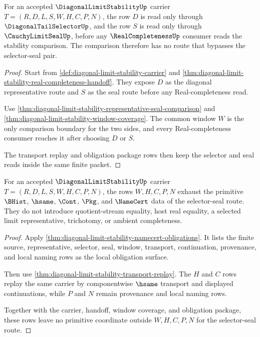 \begin{theorem}
\label{thm:diagonal-limit-stability-selector-seal-scope}
For an accepted $\DiagonalLimitStabilityUp$ carrier $T=(R,D,L,S,W,H,C,P,N)$, the row $D$ is read only through $\DiagonalTailSelectorUp$, and the row $S$ is read only through $\CauchyLimitSealUp$, before any $\RealCompletenessUp$ consumer reads the stability comparison. The comparison therefore has no route that bypasses the selector-seal pair.
\end{theorem}
\begin{proof}
Start from \autoref{def:diagonal-limit-stability-carrier} and \autoref{thm:diagonal-limit-stability-real-completeness-handoff}. They expose $D$ as the diagonal representative route and $S$ as the seal route before any Real-completeness read.

Use \autoref{thm:diagonal-limit-stability-representative-seal-comparison} and \autoref{thm:diagonal-limit-stability-window-coverage}. The common window $W$ is the only comparison boundary for the two sides, and every Real-completeness consumer reaches it after choosing $D$ or $S$.

The transport replay and obligation package rows then keep the selector and seal reads inside the same finite packet.
\end{proof}

\begin{theorem}
\label{thm:diagonal-limit-stability-primitive-route-exhaustion}
For an accepted $\DiagonalLimitStabilityUp$ carrier $T=(R,D,L,S,W,H,C,P,N)$, the rows $W,H,C,P,N$ exhaust the primitive $\BHist$, $\hsame$, $\Cont$, $\Pkg$, and $\NameCert$ data of the selector-seal route. They do not introduce quotient-stream equality, host real equality, a selected limit representative, trichotomy, or ambient completeness.
\end{theorem}
\begin{proof}
Apply \autoref{thm:diagonal-limit-stability-namecert-obligations}. It lists the finite source, representative, selector, seal, window, transport, continuation, provenance, and local naming rows as the local obligation surface.

Then use \autoref{thm:diagonal-limit-stability-transport-replay}. The $H$ and $C$ rows replay the same carrier by componentwise $\hsame$ transport and displayed continuations, while $P$ and $N$ remain provenance and local naming rows.

Together with the carrier, handoff, window coverage, and obligation package, these rows leave no primitive coordinate outside $W,H,C,P,N$ for the selector-seal route.
\end{proof}

